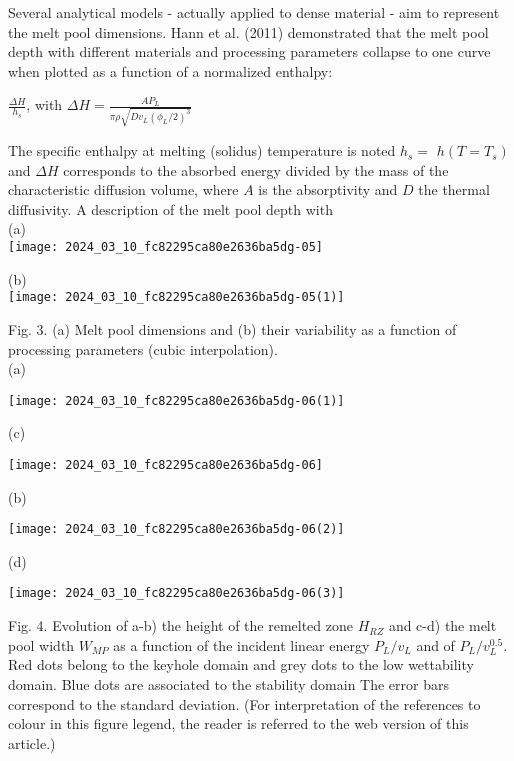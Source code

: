 \documentclass[10pt]{article}
\begin{document}
Several analytical models - actually applied to dense material - aim to represent the melt pool dimensions. Hann et al. (2011) demonstrated that the melt pool depth with different materials and processing parameters collapse to one curve when plotted as a function of a normalized enthalpy:

$\frac{\Delta H}{h_{s}}$, with $\Delta H=\frac{A P_{L}}{\pi \rho \sqrt{D v_{L}\left(\phi_{L} / 2\right)^{3}}}$

The specific enthalpy at melting (solidus) temperature is noted $h_{s}=$ $h\left(T=T_{s}\right)$ and $\Delta H$ corresponds to the absorbed energy divided by the mass of the characteristic diffusion volume, where $A$ is the absorptivity and $D$ the thermal diffusivity. A description of the melt pool depth with\\
(a)\\
\texttt{[image: 2024\_03\_10\_fc82295ca80e2636ba5dg-05]}

(b)\\
\texttt{[image: 2024\_03\_10\_fc82295ca80e2636ba5dg-05(1)]}

Fig. 3. (a) Melt pool dimensions and (b) their variability as a function of processing parameters (cubic interpolation).\\
(a)

\begin{center}
\texttt{[image: 2024\_03\_10\_fc82295ca80e2636ba5dg-06(1)]}
\end{center}

(c)

\begin{center}
\texttt{[image: 2024\_03\_10\_fc82295ca80e2636ba5dg-06]}
\end{center}

(b)

\begin{center}
\texttt{[image: 2024\_03\_10\_fc82295ca80e2636ba5dg-06(2)]}
\end{center}

(d)

\begin{center}
\texttt{[image: 2024\_03\_10\_fc82295ca80e2636ba5dg-06(3)]}
\end{center}

Fig. 4. Evolution of a-b) the height of the remelted zone $H_{R Z}$ and c-d) the melt pool width $W_{M P}$ as a function of the incident linear energy $P_{L} / v_{L}$ and of $P_{L} / v_{L}^{0.5}$. Red dots belong to the keyhole domain and grey dots to the low wettability domain. Blue dots are associated to the stability domain The error bars correspond to the standard deviation. (For interpretation of the references to colour in this figure legend, the reader is referred to the web version of this article.)
\end{document}
